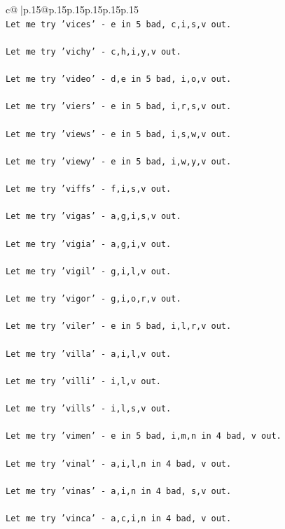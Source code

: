 \documentclass{article}
\begin{document}
{\begin{supertabular}{c@{$\;$}|p{.15\linewidth}@{}p{.15\linewidth}p{.15\linewidth}p{.15\linewidth}p{.15\linewidth}p{.15\linewidth}}
{{{\\ 
\texttt{Let me try 'vices' {-} e in 5 bad, c,i,s,v out. } \\
\\ 
\texttt{Let me try 'vichy' {-} c,h,i,y,v out. } \\
\\ 
\texttt{Let me try 'video' {-} d,e in 5 bad, i,o,v out. } \\
\\ 
\texttt{Let me try 'viers' {-} e in 5 bad, i,r,s,v out. } \\
\\ 
\texttt{Let me try 'views' {-} e in 5 bad, i,s,w,v out. } \\
\\ 
\texttt{Let me try 'viewy' {-} e in 5 bad, i,w,y,v out. } \\
\\ 
\texttt{Let me try 'viffs' {-} f,i,s,v out. } \\
\\ 
\texttt{Let me try 'vigas' {-} a,g,i,s,v out. } \\
\\ 
\texttt{Let me try 'vigia' {-} a,g,i,v out. } \\
\\ 
\texttt{Let me try 'vigil' {-} g,i,l,v out. } \\
\\ 
\texttt{Let me try 'vigor' {-} g,i,o,r,v out. } \\
\\ 
\texttt{Let me try 'viler' {-} e in 5 bad, i,l,r,v out. } \\
\\ 
\texttt{Let me try 'villa' {-} a,i,l,v out. } \\
\\ 
\texttt{Let me try 'villi' {-} i,l,v out. } \\
\\ 
\texttt{Let me try 'vills' {-} i,l,s,v out. } \\
\\ 
\texttt{Let me try 'vimen' {-} e in 5 bad, i,m,n in 4 bad, v out. } \\
\\ 
\texttt{Let me try 'vinal' {-} a,i,l,n in 4 bad, v out. } \\
\\ 
\texttt{Let me try 'vinas' {-} a,i,n in 4 bad, s,v out. } \\
\\ 
\texttt{Let me try 'vinca' {-} a,c,i,n in 4 bad, v out. } \\
}}}
\end{supertabular}}
\end{document}
